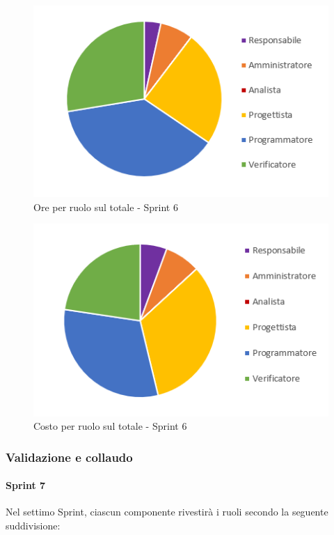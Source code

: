\begin{figure}[H]
  \centering
  \includegraphics[scale=0.8]{immagini/6Sprint_oreRuolo.png}
  \caption{Ore per ruolo sul totale - Sprint 6}
\end{figure}

\begin{figure}[H]
  \centering
  \includegraphics[scale=0.8]{immagini/6Sprint_costoRuolo.png}
  \caption{Costo per ruolo sul totale - Sprint 6}
\end{figure}
\pagebreak


\subsubsection{Validazione e collaudo}
\paragraph{Sprint 7}
Nel settimo Sprint\glo{}, ciascun componente rivestirà i ruoli secondo la seguente suddivisione:

